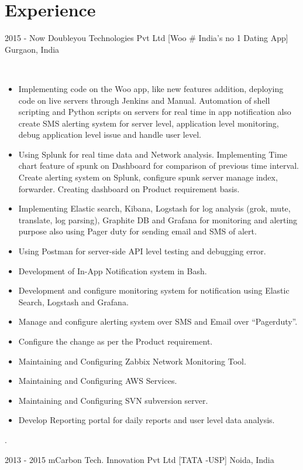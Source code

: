 \documentclass[]{cs-style} %
\begin{document}
\section{Experience}
\begin{entrylist}
\entry
  {2015 - Now}
  {Doubleyou Technologies Pvt Ltd [Woo # India’s no 1 Dating App]}
  {Gurgaon, India}
  {\\
\begin{itemize}
\item Implementing code on the Woo app, like new features addition, deploying code on live servers through Jenkins and Manual. Automation of shell scripting and Python scripts on servers for real time in app notification also create SMS alerting system for server level, application level monitoring, debug application level issue and handle user level.
\item Using Splunk for real time data and Network analysis. Implementing Time chart feature of spunk on Dashboard for comparison of previous time interval. Create alerting system on Splunk, configure spunk server manage index, forwarder. Creating dashboard on Product requirement basis.
\item Implementing Elastic search, Kibana, Logstash for log analysis (grok, mute, translate, log parsing), Graphite DB and Grafana for monitoring and alerting purpose also using Pager duty for sending email and SMS of alert.
\item Using Postman for server-side API level testing and debugging error.
\item Development of In-App Notification system in Bash.
\item Development and configure monitoring system for notification using Elastic Search, Logstash and Grafana.
\item Manage and configure alerting system over SMS and Email over “Pagerduty”.
\item Configure the change as per the Product requirement.
\item Maintaining and Configuring Zabbix Network Monitoring Tool.
\item Maintaining and Configuring AWS Services.
\item Maintaining and Configuring SVN subversion server.
\item Develop Reporting portal for daily reports and user level data analysis.
\end{itemize}
.}
\entry
  {2013 - 2015}
  {mCarbon Tech. Innovation Pvt Ltd [TATA -USP]}
  {Noida, India}
  {\
}
\end{entrylist}
\end{document}
